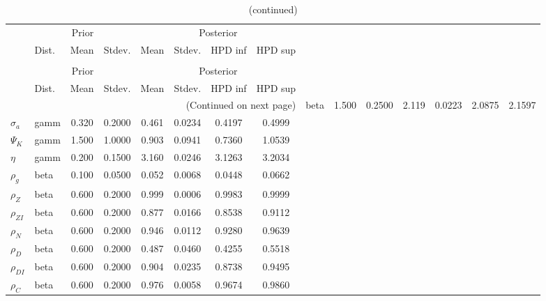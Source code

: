  
\begin{center}
\begin{longtable}{llcccccc} 
\caption{Results from Metropolis-Hastings (parameters)}
 \label{Table:MHPosterior:1}\\
\toprule 
  & \multicolumn{3}{c}{Prior}  &  \multicolumn{4}{c}{Posterior} \\
  \cmidrule(r{.75em}){2-4} \cmidrule(r{.75em}){5-8}
  & Dist. & Mean  & Stdev. & Mean & Stdev. & HPD inf & HPD sup\\
\midrule \endfirsthead 
\caption{(continued)}\\\toprule 
  & \multicolumn{3}{c}{Prior}  &  \multicolumn{4}{c}{Posterior} \\
  \cmidrule(r{.75em}){2-4} \cmidrule(r{.75em}){5-8}
  & Dist. & Mean  & Stdev. & Mean & Stdev. & HPD inf & HPD sup\\
\midrule \endhead 
\bottomrule \multicolumn{8}{r}{(Continued on next page)} \endfoot 
\bottomrule \endlastfoot 
${\gamma}$ & beta &   1.500 & 0.2500 &   2.119& 0.0223 &  2.0875 &  2.1597 \\ 
${\sigma_a}$ & gamm &   0.320 & 0.2000 &   0.461& 0.0234 &  0.4197 &  0.4999 \\ 
${\Psi_K}$ & gamm &   1.500 & 1.0000 &   0.903& 0.0941 &  0.7360 &  1.0539 \\ 
${\eta}$ & gamm &   0.200 & 0.1500 &   3.160& 0.0246 &  3.1263 &  3.2034 \\ 
${\rho_g}$ & beta &   0.100 & 0.0500 &   0.052& 0.0068 &  0.0448 &  0.0662 \\ 
${\rho_Z}$ & beta &   0.600 & 0.2000 &   0.999& 0.0006 &  0.9983 &  0.9999 \\ 
${\rho_{ZI}}$ & beta &   0.600 & 0.2000 &   0.877& 0.0166 &  0.8538 &  0.9112 \\ 
${\rho_N}$ & beta &   0.600 & 0.2000 &   0.946& 0.0112 &  0.9280 &  0.9639 \\ 
${\rho_D}$ & beta &   0.600 & 0.2000 &   0.487& 0.0460 &  0.4255 &  0.5518 \\ 
${\rho_{DI}}$ & beta &   0.600 & 0.2000 &   0.904& 0.0235 &  0.8738 &  0.9495 \\ 
${\rho_C}$ & beta &   0.600 & 0.2000 &   0.976& 0.0058 &  0.9674 &  0.9860 \\ 
\end{longtable}
 \end{center}

